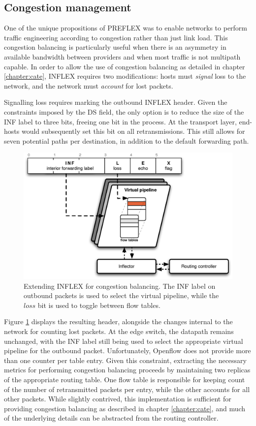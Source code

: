 \subsection{Congestion management}

One of the unique propositions of \ac{PREFLEX} was to enable networks to perform traffic engineering according to congestion rather than just link load.
This congestion balancing is particularly useful when there is an asymmetry in available bandwidth between providers and when most traffic is not multipath capable.
In order to allow the use of congestion balancing as detailed in chapter \ref{chapter:cate}, INFLEX requires two modifications: hosts must \emph{signal} loss to the network, and the network must \emph{account} for lost packets.

Signalling loss requires marking the outbound INFLEX header.
Given the constraints imposed by the \ac{DS} field, the only option is to reduce the size of the \ac{INF} label to three bits, freeing one bit in the process.
At the transport layer, end-hosts would subsequently set this bit on all retransmissions.
This still allows for seven potential paths per destination, in addition to the default forwarding path.

\begin{figure}
    \centering
    \includegraphics[width=0.7\linewidth]{figures/inflex/infloss}
    \caption[Extending INFLEX for congestion balancing.]{Extending INFLEX for congestion balancing. The \ac{INF} label on outbound packets is used to select the virtual pipeline, while the $loss$ bit is used to toggle between flow tables.\label{fig:inflexloss}}
\end{figure}

Figure \ref{fig:inflexloss} displays the resulting header, alongside the changes internal to the network for counting lost packets.
At the edge switch, the datapath remains unchanged, with the \ac{INF} label still being used to select the appropriate virtual pipeline for the outbound packet.
Unfortunately, Openflow does not provide more than one counter per table entry.
Given this constraint, extracting the necessary metrics for performing congestion balancing proceeds by maintaining two replicas of the appropriate routing table.
One flow table is responsible for keeping count of the number of retransmitted packets per entry, while the other accounts for all other packets.
While slightly contrived, this implementation is sufficient for providing congestion balancing as described in chapter \ref{chapter:cate}, and much of the underlying details can be abstracted from the routing controller.

